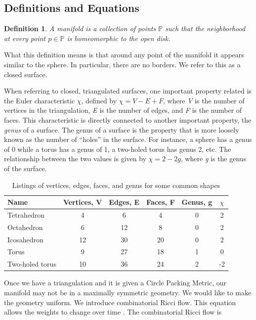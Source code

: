 \documentclass[12pt]{article}
\newtheorem{definition}[theorem]{Definition}
\begin{document}
\subsection{Definitions and Equations}
\label{ricciDef}

\begin{definition}
A manifold is a collection of points $\mathbb{P}$ such that the neighborhood at every point $p\in\mathbb{P}$ is homeomorphic to the open disk.
\end{definition}

 What this definition means is that around any point of the manifold it appears similar to the sphere. In particular, there are no borders. We refer to this as a closed surface.

 When referring to closed, triangulated surfaces, one important property related is the Euler characteristic $\chi$, defined by $\chi = V - E + F$, where \textit{V} is the number of vertices in the triangulation, \textit{E} is the number of edges, and \textit{F} is the number of faces. This characteristic is directly connected to another important property, the \textit{genus} of a surface. The genus of a surface is the property that is more loosely known as the number of ``holes'' in the surface. For instance, a sphere has a genus of 0 while a torus has a genus of 1, a two-holed torus has genus 2, etc. The relationship between the two values is given by $\chi = 2 - 2g$, where \textit{g} is the genus of the surface. 

\begin{table}
\begin{tabular}{lccccc}
Name  &	Vertices, V &	Edges, E & Faces, F &	Genus, g & $\chi$\\
\hline 
Tetrahedron &	4 &	6 &	4 &	0 & 2\\
Octahedron 	&	6 &	12 &	8 & 0 &	 2\\
Icosahedron &	12 & 30 & 20 & 0	&	 2\\
Torus & 9 & 27 & 18 &	1 & 0\\
Two-holed torus & 10 & 36 & 24 &	2 & -2\\
\end{tabular}
\caption{Listings of vertices, edges, faces, and genus for some common shapes}
\label{EuChar}
\end{table}

 Once we have a triangulation and it is given a Circle Packing Metric, our manifold may not be in a maximally symmetric geometry. We would like to make the geometry uniform. We introduce combinatorial Ricci flow. This equation allows the weights to change over time \cite{chowluo}. The combinatorial Ricci flow is
\end{document}
